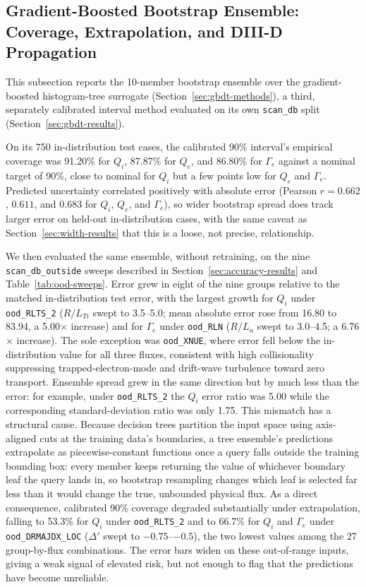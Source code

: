 \documentclass[12pt,letterpaper]{article}
\begin{document}
\subsection{Gradient-Boosted Bootstrap Ensemble: Coverage, Extrapolation, and DIII-D Propagation}
\label{sec:gbdt-uncertainty-results}

This subsection reports the 10-member bootstrap ensemble over the
gradient-boosted histogram-tree surrogate (Section~\ref{sec:gbdt-methods}), a
third, separately calibrated interval method evaluated on its own
\texttt{scan\_db} split (Section~\ref{sec:gbdt-results}).

On its 750 in-distribution test cases, the calibrated 90\% interval's
empirical coverage was 91.20\% for $Q_i$, 87.87\% for $Q_e$, and 86.80\% for
$\Gamma_e$ against a nominal target of 90\%, close to nominal for $Q_i$ but a
few points low for $Q_e$ and $\Gamma_e$. Predicted uncertainty correlated
positively with absolute error (Pearson $r = 0.662$, $0.611$, and $0.683$ for
$Q_i$, $Q_e$, and $\Gamma_e$), so wider bootstrap spread does track larger
error on held-out in-distribution cases, with the same caveat as
Section~\ref{sec:width-results} that this is a loose, not precise,
relationship.

We then evaluated the same ensemble, without retraining, on the nine
\texttt{scan\_db\_outside} sweeps described in
Section~\ref{sec:accuracy-results} and Table~\ref{tab:ood-sweeps}. Error grew
in eight of the nine groups relative to the matched in-distribution test
error, with the largest growth for $Q_i$ under \texttt{ood\_RLTS\_2}
($R/L_{Ti}$ swept to 3.5--5.0; mean absolute error rose from 16.80 to 83.94,
a 5.00$\times$ increase) and for $\Gamma_e$ under \texttt{ood\_RLN}
($R/L_n$ swept to 3.0--4.5; a 6.76$\times$ increase). The sole exception was
\texttt{ood\_XNUE}, where error fell below the in-distribution value for all
three fluxes, consistent with high collisionality suppressing trapped-electron-mode
and drift-wave turbulence toward zero transport. Ensemble spread grew in the
same direction but by much less than the error: for example, under
\texttt{ood\_RLTS\_2} the $Q_i$ error ratio was 5.00 while the corresponding
standard-deviation ratio was only 1.75. This mismatch has a structural cause.
Because decision trees partition the input space using axis-aligned cuts at
the training data's boundaries, a tree ensemble's predictions extrapolate as
piecewise-constant functions once a query falls outside the training bounding
box: every member keeps returning the value of whichever boundary leaf the
query lands in, so bootstrap resampling changes which leaf is selected far
less than it would change the true, unbounded physical flux. As a direct
consequence, calibrated 90\% coverage degraded substantially under
extrapolation, falling to 53.3\% for $Q_i$ under \texttt{ood\_RLTS\_2} and to
66.7\% for $Q_i$ and $\Gamma_e$ under \texttt{ood\_DRMAJDX\_LOC} ($\Delta'$
swept to $-0.75$--$-0.5$), the two lowest values among the 27 group-by-flux
combinations. The error bars widen on these out-of-range inputs, giving a
weak signal of elevated risk, but not enough to flag that the predictions
have become unreliable.
\end{document}
